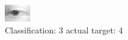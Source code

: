 \begin{figure}[h!]
\begin{center}
\includegraphics[width=0.60\columnwidth]{figures/ID2719_class_3_target_4.png}
\end{center}
\caption{ Classification: 3 actual target: 4}
\label{fig:ID2719_class_3_target_4}
\end{figure}
